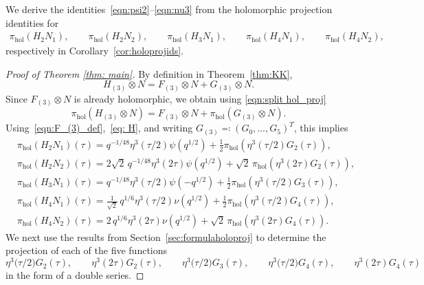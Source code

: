 \documentclass[11pt,reqno]{amsart}
\newcommand{\holoproj}[1]{\pi_{\mathrm{hol}}\left(#1\right)}
\renewcommand{\=}{\;=\;}
\theoremstyle{myremark}
\begin{document}
We derive the identities~\eqref{eqn:psi2}--\eqref{eqn:nu3} from the holomorphic projection identities for
\begin{align}
\holoproj{H_{2}N_1},\qquad \holoproj{H_{2}N_2},\qquad \holoproj{H_{3}N_1}, 
\qquad \holoproj{H_{4}N_1},\qquad \holoproj{H_{4}N_2},
\end{align}
respectively in Corollary~\ref{cor:holoprojids}.
\begin{proof}[Proof of Theorem \ref{thm: main}]
By definition in Theorem~\ref{thm:KK},
\begin{equation*}
    H_{(3)} \otimes N = F_{(3)}\otimes N + G_{(3)}\otimes N.
\end{equation*}
Since $F_{(3)}\otimes N$ is already holomorphic, we obtain using \eqref{eqn:split hol_proj}
\begin{equation*}
\holoproj{H_{(3)} \otimes N} = F_{(3)}\otimes N + \holoproj{G_{(3)}\otimes N}.
\end{equation*}
Using~\eqref{eqn:F_(3)_def},~\eqref{eq: H}, and writing $G_{(3)}\eqqcolon(G_0,\ldots,G_5)^T$, this implies
\begin{equation}\label{eqn:holproj_holproj}
\begin{aligned}
&
\holoproj{H_{2}N_1}(\tau) = q^{-1/48}\eta^3(\tau/2)\psi(q^{1/2}) + \frac{1}{2}\holoproj{\eta^{3}(\tau/2)G_{2}(\tau)},\\
&
\holoproj{H_{2}N_2}(\tau) = 2\sqrt{2}\,q^{-1/48}\eta^3(2\tau)\psi(q^{1/2}) + \sqrt{2}\,\holoproj{\eta^{3}(2\tau)G_{2}(\tau)},\\
&
\holoproj{H_{3}N_1}(\tau) = q^{-1/48}\eta^3(\tau/2)\psi(-q^{1/2}) + \frac{1}{2}\holoproj{\eta^{3}(\tau/2)G_{3}(\tau)},\\
&
\holoproj{H_{4}N_1}(\tau) = \frac{1}{\sqrt{2}}\, q^{1/6}\eta^3(\tau/2)\nu(q^{1/2}) + \frac{1}{2}\holoproj{\eta^{3}(\tau/2)G_{4}(\tau)},\\
&
\holoproj{H_{4}N_2}(\tau) = 2\, q^{1/6}\eta^3(2\tau)\nu(q^{1/2}) + \sqrt{2}\,\holoproj{\eta^{3}(2\tau)G_{4}(\tau)}.
\end{aligned}
\end{equation}
We next use the results from Section~\ref{sec:formulaholoproj} to determine the projection of each of the five functions
\begin{equation} \label{eqn:functions_to_be_projected}
\eta^3\Big({\tau/ 2}\Big)G_{2}(\tau), \qquad \eta^3(2\tau) G_{2}(\tau), \qquad \eta^3\Big({\tau/2}\Big)G_{3}(\tau), \qquad \eta^3\Big({\tau/2}\Big)G_{4}(\tau), \qquad \eta^3(2\tau)G_{4}(\tau)
\end{equation}
in the form of a double series. 


\end{proof}
\end{document}
